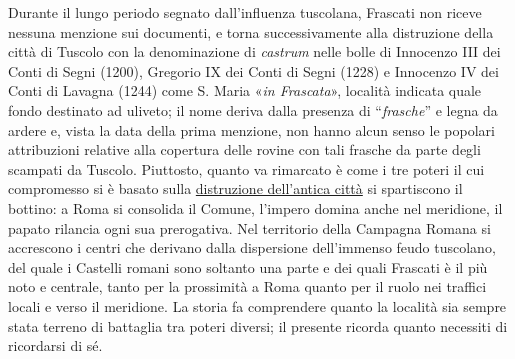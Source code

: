 \documentclass[
  letterpaper,
  DIV=11,
  numbers=noendperiod]{scrartcl}
\begin{document}
Durante il lungo periodo segnato dall'influenza tuscolana, Frascati non
riceve nessuna menzione sui documenti, e torna successivamente alla
distruzione della città di Tuscolo con la denominazione di
\emph{castrum} nelle bolle di Innocenzo III dei Conti di Segni (1200),
Gregorio IX dei Conti di Segni (1228) e Innocenzo IV dei Conti di
Lavagna (1244) come S. Maria «\emph{in Frascata}», località indicata
quale fondo destinato ad uliveto; il nome deriva dalla presenza di
``\emph{frasche}'' e legna da ardere e, vista la data della prima
menzione, non hanno alcun senso le popolari attribuzioni relative alla
copertura delle rovine con tali frasche da parte degli scampati da
Tuscolo. Piuttosto, quanto va rimarcato è come i tre poteri il cui
compromesso si è basato sulla
\href{2016-09-07-8-settembre-frascati-tuscolo-comandini.html}{distruzione
dell'antica città} si spartiscono il bottino: a Roma si consolida il
Comune, l'impero domina anche nel meridione, il papato rilancia ogni sua
prerogativa. Nel territorio della Campagna Romana si accrescono i centri
che derivano dalla dispersione dell'immenso feudo tuscolano, del quale i
Castelli romani sono soltanto una parte e dei quali Frascati è il più
noto e centrale, tanto per la prossimità a Roma quanto per il ruolo nei
traffici locali e verso il meridione. La storia fa comprendere quanto la
località sia sempre stata terreno di battaglia tra poteri diversi; il
presente ricorda quanto necessiti di ricordarsi di sé.
\end{document}
